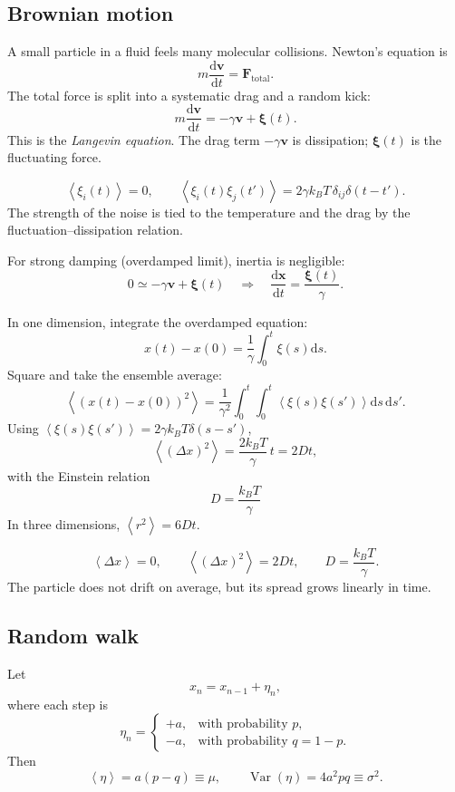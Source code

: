 \documentclass[10.5pt,a4paper]{article}
\newcommand{\dd}{\mathrm{d}}
\newcommand{\avg}[1]{\left\langle #1 \right\rangle}
\begin{document}
\subsection{Brownian motion}

A small particle in a fluid feels many molecular collisions. Newton's
equation is
\[
m\frac{\dd\mathbf v}{\dd t}=\mathbf F_{\text{total}}.
\]
The total force is split into a systematic drag and a random kick:
\[
m\frac{\dd\mathbf v}{\dd t}
=-\gamma\mathbf v+\boldsymbol\xi(t).
\]
This is the \emph{Langevin equation}. The drag term \(-\gamma\mathbf v\)
is dissipation; \(\boldsymbol\xi(t)\) is the fluctuating force.

\begin{keybox}
\[
\avg{\xi_i(t)}=0,
\qquad
\avg{\xi_i(t)\xi_j(t')}
=2\gamma k_BT\,\delta_{ij}\delta(t-t').
\]
The strength of the noise is tied to the temperature and the drag by the
fluctuation--dissipation relation.
\end{keybox}

For strong damping (overdamped limit), inertia is negligible:
\[
0\simeq-\gamma\mathbf v+\boldsymbol\xi(t)
\quad\Longrightarrow\quad
\frac{\dd\mathbf x}{\dd t}=\frac{\boldsymbol\xi(t)}{\gamma}.
\]

\begin{derivbox}
In one dimension, integrate the overdamped equation:
\[
x(t)-x(0)=\frac{1}{\gamma}\int_0^t\xi(s)\dd s.
\]
Square and take the ensemble average:
\[
\avg{(x(t)-x(0))^2}
=\frac{1}{\gamma^2}\int_0^t\!\!\int_0^t
\avg{\xi(s)\xi(s')}\dd s\,\dd s'.
\]
Using \(\avg{\xi(s)\xi(s')}=2\gamma k_BT\delta(s-s')\),
\[
\avg{(\Delta x)^2}
=\frac{2k_BT}{\gamma}\,t
=2Dt,
\]
with the Einstein relation
\[
\boxed{\;D=\frac{k_BT}{\gamma}\;}
\]
In three dimensions, \(\avg{r^2}=6Dt\).
\end{derivbox}

\begin{keybox}
\[
\avg{\Delta x}=0,\qquad
\avg{(\Delta x)^2}=2Dt,\qquad
D=\frac{k_BT}{\gamma}.
\]
The particle does not drift on average, but its spread grows linearly
in time.
\end{keybox}

\subsection{Random walk}

Let
\[
x_n=x_{n-1}+\eta_n,
\]
where each step is
\[
\eta_n=
\begin{cases}
+a, & \text{with probability }p,\\
-a, & \text{with probability }q=1-p.
\end{cases}
\]
Then
\[
\avg{\eta}=a(p-q)\equiv\mu,
\qquad
\operatorname{Var}(\eta)
=4a^2pq\equiv\sigma^2.
\]
\end{document}
